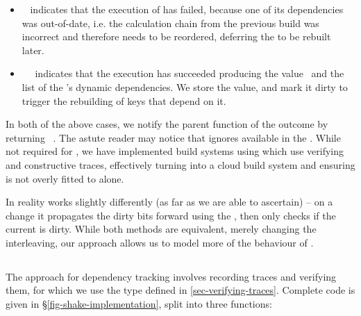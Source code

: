 \begin{itemize}
    \item {}~ indicates that the execution of  has
    failed, because one of its dependencies  was out-of-date, i.e. the
    calculation chain from the previous build was incorrect and therefore needs
    to be reordered, deferring the  to be rebuilt later.
    \item {}~~ indicates that the
    execution has succeeded producing the value~ and the list of the
    's dynamic dependencies. We store the value, and mark it dirty to
    trigger the rebuilding of keys that depend on it.
\end{itemize}

In both of the above cases, we notify the parent  function of
the outcome by returning ~. The astute reader may notice
that  ignores  available in the .
While not required for \Excel, we have implemented build systems using
 which use verifying and constructive traces, effectively turning
\Excel into a cloud build system and ensuring  is not overly
fitted to \Excel alone.

In reality \Excel works slightly differently (as far as we are able to ascertain) --
on a change it propagates the dirty bits forward using the , then only checks if the current  is dirty. While both methods are equivalent, merely changing the interleaving, our approach allows us to model more of the behaviour of \Excel.

\vspace{-2mm}
\subsection{\Shake}\label{sec-implementation-shake}
\vspace{-1mm}

The \Shake approach for dependency tracking involves recording traces and verifying them, for which we use the  type defined in \ref{sec-verifying-traces}. Complete code is given in \S\ref{fig-shake-implementation}, split into three functions:

